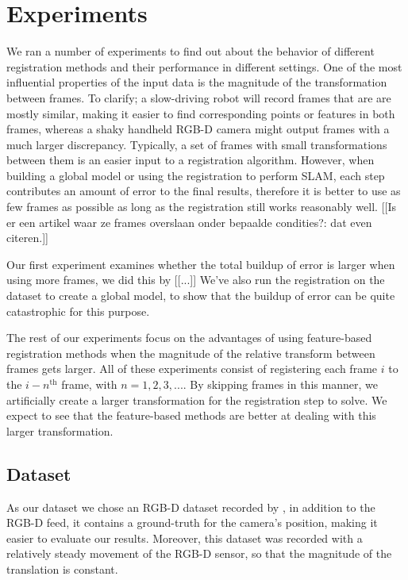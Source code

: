 \documentclass[a4paper]{article}
\begin{document}
\section{Experiments}

We ran a number of experiments to find out about the behavior of different registration methods and their performance in different settings. One of the most influential properties of the input data is the magnitude of the transformation between frames. To clarify; a slow-driving robot will record frames that are are mostly similar, making it easier to find corresponding points or features in both frames, whereas a shaky handheld RGB-D camera might output frames with a much larger discrepancy. Typically, a set of frames with small transformations between them is an easier input to a registration algorithm. However, when building a global model or using the registration to perform SLAM, each step contributes an amount of error to the final results, therefore it is better to use as few frames as possible as long as the registration still works reasonably well. [[Is er een artikel waar ze frames overslaan onder bepaalde condities?: dat even citeren.]]

Our first experiment examines whether the total buildup of error is larger when using more frames, we did this by [[...]] We've also run the registration on the dataset to create a global model, to show that the buildup of error can be quite catastrophic for this purpose.

The rest of our experiments focus on the advantages of using feature-based registration methods when the magnitude of the relative transform between frames gets larger. All of these experiments consist of registering each frame $i$ to the $i-n^{\mathrm{th}}$ frame, with $n = 1,2,3,...$. By skipping frames in this manner, we artificially create a larger transformation for the registration step to solve. We expect to see that the feature-based methods are better at dealing with this larger transformation.

\subsection{Dataset}

As our dataset we chose an RGB-D dataset recorded by \cite{sturm11rss-rgbd}, in addition to the RGB-D feed, it contains a ground-truth for the camera's position, making it easier to evaluate our results. Moreover, this dataset was recorded with a relatively steady movement of the RGB-D sensor, so that the magnitude of the translation is constant.
\end{document}

